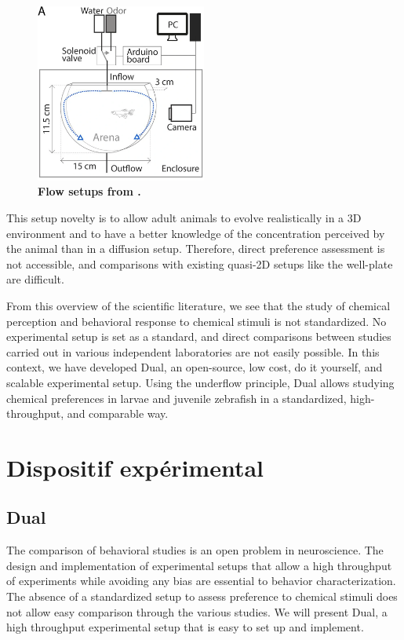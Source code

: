     \begin{figure}[h]
      \centering
      \includegraphics[width=0.5\textwidth]{part_2/assets/flow_1.png}
      \caption{\textbf{Flow setups from \cite{kermen2020stimulus}.}}
      \label{flow_1_setup}
    \end{figure}

    This setup novelty is to allow adult animals to evolve realistically in a 3D environment and to have a better knowledge of the concentration perceived by the animal than in a diffusion setup. Therefore, direct preference assessment is not accessible, and comparisons with existing quasi-2D setups like the well-plate are difficult.

    From this overview of the scientific literature, we see that the study of chemical perception and behavioral response to chemical stimuli is not standardized. No experimental setup is set as a standard, and direct comparisons between studies carried out in various independent laboratories are not easily possible. In this context, we have developed Dual, an open-source, low cost, do it yourself, and scalable experimental setup. Using the underflow principle, Dual allows studying chemical preferences in larvae and juvenile zebrafish in a standardized, high-throughput, and comparable way.

\chapter{Dispositif expérimental}

  \section{Dual}
  The comparison of behavioral studies is an open problem in neuroscience. The design and implementation of experimental setups that allow a high throughput of experiments while avoiding any bias are essential to behavior characterization. The absence of a standardized setup to assess preference to chemical stimuli does not allow easy comparison through the various studies. We will present Dual, a high throughput experimental setup that is easy to set up and implement.

